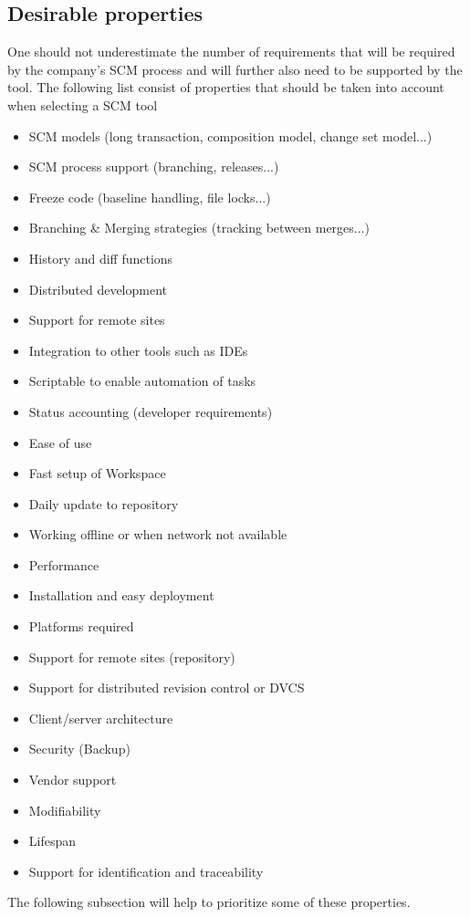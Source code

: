 \documentclass[10pt]{article}
\begin{document}
\subsection{Desirable properties}
One should not underestimate the number of requirements that will be required by the company's SCM process and will further also need to be supported by the tool. The following list consist of properties that should be taken into account when selecting a SCM tool
\begin{itemize}
\item SCM models (long transaction, composition model, change set model...)
\item SCM process support (branching, releases...)
\item Freeze code (baseline handling, file locks...)
\item Branching \& Merging strategies (tracking between merges...)
\item History and diff functions
\item Distributed development
\item Support for remote sites
\item Integration to other tools such as IDEs
\item Scriptable to enable automation of tasks
\item Status accounting (developer requirements)
\item Ease of use
\item Fast setup of Workspace
\item Daily update to repository
\item Working offline or when network not available
\item Performance
\item Installation and easy deployment
\item Platforms required
\item Support for remote sites (repository)
\item Support for distributed revision control or DVCS
\item Client/server architecture
\item Security (Backup)
\item Vendor support
\item Modifiability
\item Lifespan
\item Support for identification and traceability
\end{itemize}
\cite{Sayko}\cite{ABB}
The following subsection will help to prioritize some of these properties.
\end{document}
